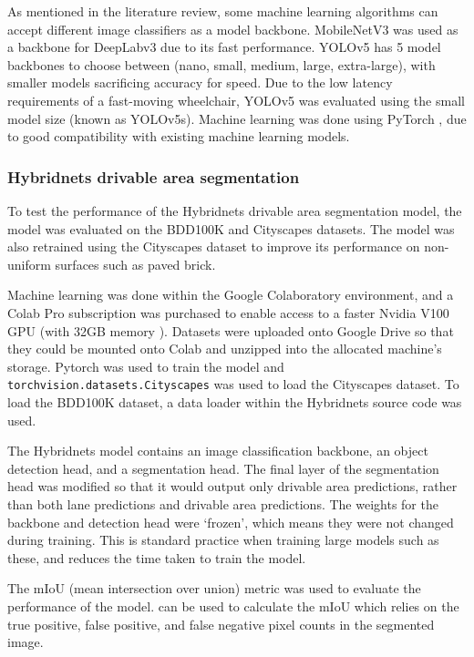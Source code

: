 As mentioned in the literature review, some machine learning algorithms can accept
different image classifiers as a model backbone.
MobileNetV3 \cite{howardSearchingMobileNetV32019} was used as a backbone for DeepLabv3 due to its fast performance.
YOLOv5 has 5 model backbones to choose between (nano, small, medium, large, extra-large),
with smaller models sacrificing accuracy for speed. Due to the low latency requirements
of a fast-moving wheelchair, YOLOv5 was evaluated using the small model size (known as YOLOv5s).
Machine learning was done using PyTorch \cite{paszkePyTorchImperativeStyle2019}, due to good compatibility
with existing machine learning models.

\subsubsection{Hybridnets drivable area segmentation}
To test the performance of the Hybridnets drivable area segmentation model,
the model was evaluated on the BDD100K and Cityscapes \cite{cordtsCityscapesDatasetSemantic2016}
datasets. The model was also retrained using the Cityscapes dataset
to improve its performance on non-uniform surfaces such as paved brick.

Machine learning was done within the Google Colaboratory environment,
and a Colab Pro subscription was purchased to enable access to
a faster Nvidia V100 GPU (with 32GB memory \cite{nvidiaNvidiaTeslaV1002018}).
Datasets were uploaded onto Google Drive so that they could be mounted onto Colab
and unzipped into the allocated machine's storage. Pytorch was used to train
the model and \texttt{torchvision.datasets.Cityscapes} was used to load the Cityscapes
dataset. To load the BDD100K dataset, a data loader within the Hybridnets source code
was used.

The Hybridnets model contains an image classification backbone, an object
detection head, and a segmentation head. The final layer of the segmentation head
was modified so that it would output only drivable area predictions, rather
than both lane predictions and drivable area predictions.
The weights for the backbone and detection head were `frozen', which means
they were not changed during training. This is standard practice when training
large models such as these, and reduces the time taken to train the model.

The mIoU (mean intersection over union) metric was used to evaluate the
performance of the model.  can be used to calculate the mIoU
which relies on the true positive, false positive, and false negative
pixel counts in the segmented image.

